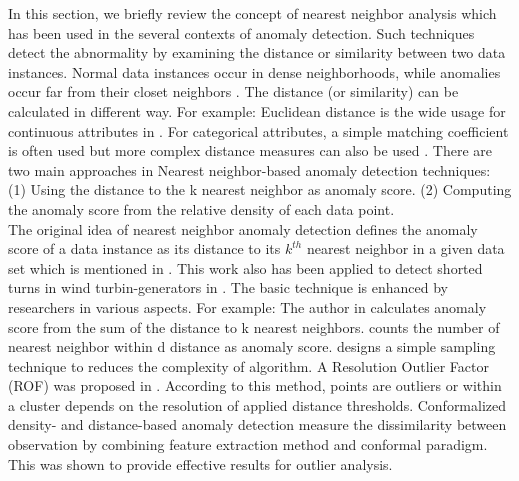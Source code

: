 In this section, we briefly review the concept of nearest neighbor analysis which has been used in the several contexts of anomaly detection. Such techniques detect the abnormality by examining the distance or similarity between two data instances. Normal data instances occur in dense neighborhoods, while anomalies occur far from their closet neighbors \cite{chandola2009anomaly}. The distance (or similarity) can be calculated in different way. For example: Euclidean distance is the wide usage for continuous attributes in \cite{Breunig:2000:LID:335191.335388}\cite{tang2001robust}\cite{kriegel2009loop}. For categorical attributes, a simple matching coefficient is often used but more complex distance measures can also be used \cite{boriah2008similarity}\cite{chandola2008understanding}. There are two main approaches in Nearest neighbor-based anomaly detection techniques: (1) Using the distance to the k nearest neighbor as anomaly score. (2) Computing the anomaly score from the relative density of each data point.\\

The original idea of nearest neighbor anomaly detection defines the anomaly score of a data instance as its distance to its $ k^{th} $ nearest neighbor in a given data set which is mentioned in \cite{byers1998nearest}. This work also has been applied to detect shorted turns in wind turbin-generators in \cite{guttormsson1999elliptical}. The basic technique is enhanced by researchers in various aspects. For example: The author in \cite{eskin2002geometric}\cite{angiulli2002fast}\cite{zhang2006detecting} calculates anomaly score from the sum of the distance to k nearest neighbors. \cite{knorr1997unified} counts the number of nearest neighbor within d distance as anomaly score. \cite{wu2006outlier} designs a simple sampling technique to reduces the complexity of algorithm. A Resolution Outlier Factor (ROF) was proposed in \cite{fan2006nonparametric}. According to this method, points are outliers or within a cluster depends on the resolution of applied distance thresholds. Conformalized density- and distance-based anomaly detection \cite{burnaev2016conformalized} measure the dissimilarity between observation by combining feature extraction method and conformal paradigm. This was shown to provide effective results for outlier analysis.\\

